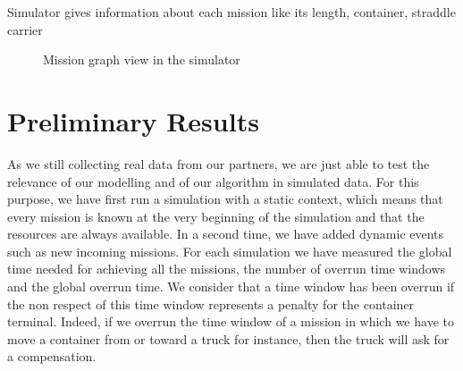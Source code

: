 \documentclass[journal]{IEEEtran}
\let\MYoriglatexcaption\caption
\renewcommand{\caption}[2][\relax]{\MYoriglatexcaption[#2]{#2}}
\begin{document}
Simulator gives information about each mission like its length, container,
straddle carrier 

\begin{figure}
	\caption{Mission graph view in the simulator}
	\label{acoview}
\end{figure}

\section{Preliminary Results}
As we still collecting real data from our partners, we are just able to test the relevance of our modelling and of our algorithm in simulated data. For this purpose, we have first
run a simulation with a static context, which means that every mission is known at the very beginning of the simulation and that the resources are always
available. In a second time, we have added dynamic events such as new incoming missions. For each simulation we have measured the global time
needed for achieving all the missions, the number of overrun time windows and the global overrun time. %
We consider that a time window has been overrun if the non respect of this time window represents a penalty for the container terminal. Indeed, if we overrun the time window of a mission in which we have to move a container from or toward a truck for instance, then the truck will ask for a compensation.
\end{document}
